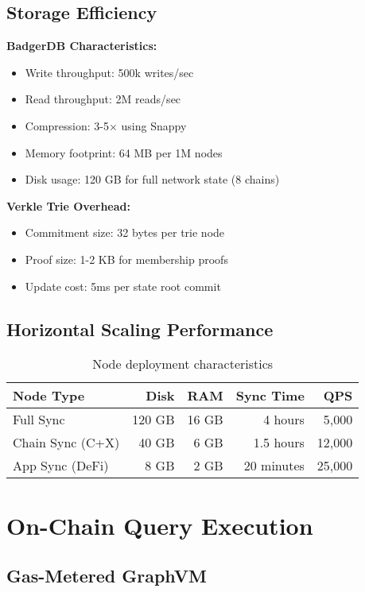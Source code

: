 \documentclass[11pt,a4paper]{article}
\begin{document}
\subsection{Storage Efficiency}

\textbf{BadgerDB Characteristics:}
\begin{itemize}
\item Write throughput: 500k writes/sec
\item Read throughput: 2M reads/sec
\item Compression: 3-5× using Snappy
\item Memory footprint: 64 MB per 1M nodes
\item Disk usage: 120 GB for full network state (8 chains)
\end{itemize}

\textbf{Verkle Trie Overhead:}
\begin{itemize}
\item Commitment size: 32 bytes per trie node
\item Proof size: 1-2 KB for membership proofs
\item Update cost: 5ms per state root commit
\end{itemize}

\subsection{Horizontal Scaling Performance}

\begin{table}[h]
\centering
\begin{tabular}{@{}lrrrr@{}}
\toprule
\textbf{Node Type} & \textbf{Disk} & \textbf{RAM} & \textbf{Sync Time} & \textbf{QPS} \\ \midrule
Full Sync & 120 GB & 16 GB & 4 hours & 5,000 \\
Chain Sync (C+X) & 40 GB & 6 GB & 1.5 hours & 12,000 \\
App Sync (DeFi) & 8 GB & 2 GB & 20 minutes & 25,000 \\ \bottomrule
\end{tabular}
\caption{Node deployment characteristics}
\end{table}

\section{On-Chain Query Execution}

\subsection{Gas-Metered GraphVM}
\end{document}
